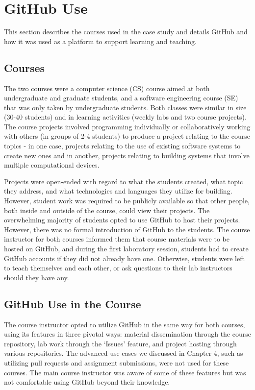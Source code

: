 \section{GitHub Use}
This section describes the courses used in the case study and details GitHub and how it was used as a platform to support learning and teaching.

\subsection{Courses}
The two courses were a computer science (CS) course aimed at both undergraduate and graduate students, and a software engineering course (SE) that was only taken by undergraduate students. Both classes were similar in size (30-40 students) and in learning activities (weekly labs and two course projects). The course projects involved programming individually or collaboratively working with others (in groups of 2-4 students) to produce a project relating to the course topics - in one case, projects relating to the use of existing software systems to create new ones and in another, projects relating to building systems that involve multiple computational devices.

Projects were open-ended with regard to what the students created, what topic they address, and what technologies and languages they utilize for building. However, student work was required to be publicly available so that other people, both inside and outside of the course, could view their projects. The overwhelming majority of students opted to use GitHub to host their projects. However, there was no formal introduction of GitHub to the students. The course instructor for both courses informed them that course materials were to be hosted on GitHub, and during the first laboratory session, students had to create GitHub accounts if they did not already have one. Otherwise, students were left to teach themselves and each other, or ask questions to their lab instructors should they have any.

\subsection{GitHub Use in the Course}
The course instructor opted to utilize GitHub in the same way for both courses, using its features in three pivotal ways: material dissemination through the course repository, lab work through the `Issues' feature, and project hosting through various repositories. The advanced use cases we discussed in Chapter 4, such as utilizing pull requests and assignment submissions, were not used for these courses. The main course instructor was aware of some of these features but was not comfortable using GitHub beyond their knowledge.

